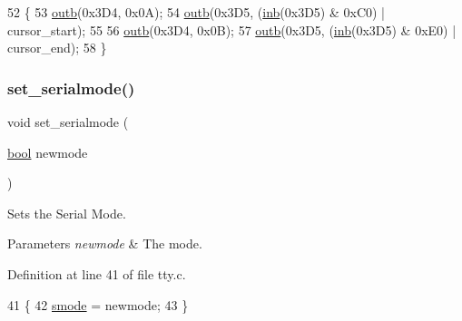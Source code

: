 \begin{DoxyCode}
52 \{
53     \hyperlink{a00164_aa37f5841c54156a4b14fc0d6f626b44f_aa37f5841c54156a4b14fc0d6f626b44f}{outb}(0x3D4, 0x0A);
54     \hyperlink{a00164_aa37f5841c54156a4b14fc0d6f626b44f_aa37f5841c54156a4b14fc0d6f626b44f}{outb}(0x3D5, (\hyperlink{a00164_a0223c8898dfec29069879dc51076e28a_a0223c8898dfec29069879dc51076e28a}{inb}(0x3D5) & 0xC0) | cursor\_start);
55  
56     \hyperlink{a00164_aa37f5841c54156a4b14fc0d6f626b44f_aa37f5841c54156a4b14fc0d6f626b44f}{outb}(0x3D4, 0x0B);
57     \hyperlink{a00164_aa37f5841c54156a4b14fc0d6f626b44f_aa37f5841c54156a4b14fc0d6f626b44f}{outb}(0x3D5, (\hyperlink{a00164_a0223c8898dfec29069879dc51076e28a_a0223c8898dfec29069879dc51076e28a}{inb}(0x3D5) & 0xE0) | cursor\_end);
58 \}
\end{DoxyCode}
\mbox{\label{a00176_ab1cdfeb7dac30904e66f81ab673ed8ca_ab1cdfeb7dac30904e66f81ab673ed8ca}} 
\subsubsection{\texorpdfstring{set\+\_\+serialmode()}{set\_serialmode()}}
{\footnotesize\ttfamily void set\+\_\+serialmode (\begin{DoxyParamCaption}\item[{\hyperlink{a00140_af6a258d8f3ee5206d682d799316314b1_af6a258d8f3ee5206d682d799316314b1}{bool}}]{newmode }\end{DoxyParamCaption})}



Sets the Serial Mode. 


\begin{DoxyParams}{Parameters}
{\em newmode} & The mode. \\
\hline
\end{DoxyParams}


Definition at line 41 of file tty.\+c.


\begin{DoxyCode}
41                                   \{
42     \hyperlink{a00173_a22b8d30f7aee33f172c1239aed53e7db_a22b8d30f7aee33f172c1239aed53e7db}{smode} = newmode;
43 \}
\end{DoxyCode}
\mbox{\label{a00176_aaf55ee008e2e63ca97eacae371646db7_aaf55ee008e2e63ca97eacae371646db7}} 
